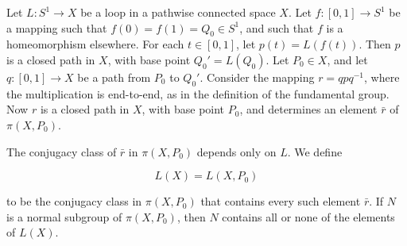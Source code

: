 Let $L: S^1 \rightarrow X$ be a loop in a pathwise connected space $X$. Let $f: [0, 1] \rightarrow S^1$ be a mapping such that $f(0) = f(1) = Q_0 \in S^1$, and such that $f$ is a homeomorphism elsewhere. For each $t \in [0, 1]$, let $p(t) = L(f(t))$. Then $p$ is a closed path in $X$, with base point $Q_0' = L(Q_0)$. Let $P_0 \in X$, and let $q: [0, 1] \rightarrow X$ be a path from $P_0$ to $Q_0'$. Consider the mapping $r = qpq^{-1}$, where the multiplication is end-to-end, as in the definition of the fundamental group. Now $r$ is a closed path in $X$, with base point $P_0$, and determines an element $\bar{r}$ of $\pi(X, P_0)$.

The conjugacy class of $\bar{r}$ in $\pi(X, P_0)$ depends only on $L$. We define

$$L(X) = L(X, P_0)$$

to be the conjugacy class in $\pi(X, P_0)$ that contains every such element $\bar{r}$. If $N$ is a normal subgroup of $\pi(X, P_0)$, then $N$ contains all or none of the elements of $L(X)$.

